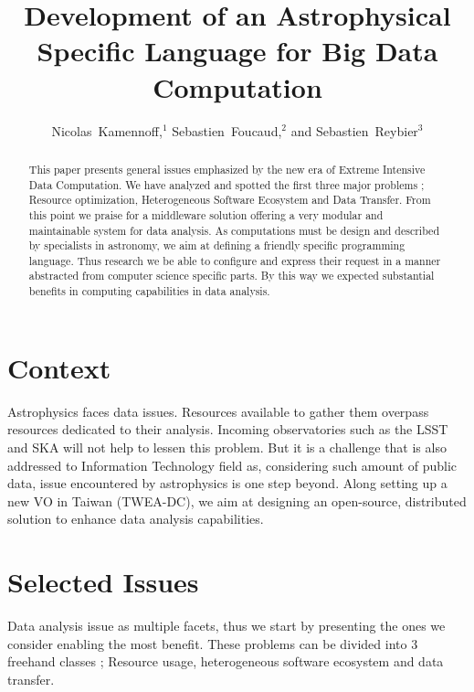 

\resetcounters



	\title{Development of an Astrophysical Specific Language for Big Data Computation}
	\author{Nicolas~Kamennoff,$^1$ Sebastien~Foucaud,$^2$ and Sebastien~Reybier$^3$}


	\begin{abstract}
		This paper presents general issues emphasized by the new era of Extreme Intensive Data Computation.
		We have analyzed and spotted the first three major problems ; Resource optimization, Heterogeneous Software Ecosystem and Data Transfer.
		From this point we praise for a middleware solution offering a very modular and maintainable system for data analysis.
		As computations must be design and described by specialists in astronomy, we aim at defining a friendly specific programming language.
		Thus research we be able to configure and express their request in a manner abstracted from computer science specific parts.
		By this way we expected substantial benefits in computing capabilities in data analysis.
	\end{abstract}

	\section{Context}
		Astrophysics faces data issues.
		Resources available to gather them overpass resources dedicated to their analysis.
		Incoming observatories such as the LSST and SKA will not help to lessen this problem.
		But it is a challenge that is also addressed to Information Technology field as, considering such amount of public data, issue encountered by astrophysics is one step beyond.
		Along setting up a new VO in Taiwan (TWEA-DC), we aim at designing an open-source, distributed solution to enhance data analysis capabilities.

	\section{Selected Issues}
		\label{BLINK_ISSUES}
		Data analysis issue as multiple facets, thus we start by presenting the ones we consider enabling the most benefit.
		These problems can be divided into 3 freehand classes ; Resource usage, heterogeneous software ecosystem and data transfer.
		

